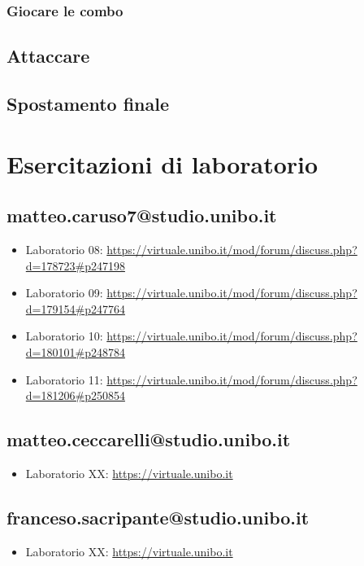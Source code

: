\documentclass[a4paper,12pt]{report}
\begin{document}
\subsection{Giocare le combo}
\section{Attaccare}
\section{Spostamento finale}

\appendix
\chapter{Esercitazioni di laboratorio}

\section{matteo.caruso7@studio.unibo.it}

\begin{itemize}
	\item Laboratorio 08: \url{https://virtuale.unibo.it/mod/forum/discuss.php?d=178723#p247198}
	\item Laboratorio 09: \url{https://virtuale.unibo.it/mod/forum/discuss.php?d=179154#p247764}
	\item Laboratorio 10: \url{https://virtuale.unibo.it/mod/forum/discuss.php?d=180101#p248784}
	\item Laboratorio 11: \url{https://virtuale.unibo.it/mod/forum/discuss.php?d=181206#p250854}
\end{itemize}

\section{matteo.ceccarelli@studio.unibo.it}
\begin{itemize}
	\item Laboratorio XX: \url{https://virtuale.unibo.it}
\end{itemize}

\section{franceso.sacripante@studio.unibo.it}
\begin{itemize}
	\item Laboratorio XX: \url{https://virtuale.unibo.it}
\end{itemize}




\end{document}
